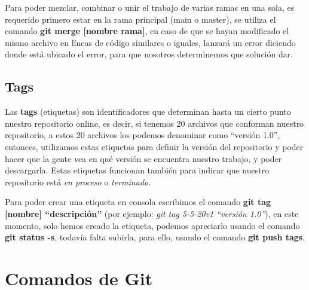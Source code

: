Para poder mezclar, combinar o unir el trabajo de varias ramas en una sola, es requerido primero estar en la rama principal (main o master), se utiliza el comando \textbf{git merge [nombre rama]}, en caso de que se hayan modificado el mismo archivo en líneas de código similares o iguales, lanzará un error diciendo donde está ubicado el error, para que nosotros determinemos que solución dar.


\subsection{Tags}

Las \textbf{tags} (etiquetas) son identificadores que determinan hasta un cierto punto nuestro repositorio online, es decir, si tenemos 20 archivos que conforman nuestro repositorio, a estos 20 archivos los podemos denominar como “versión 1.0”, entonces, utilizamos estas etiquetas para definir la versión del repositorio y poder hacer que la gente vea en qué versión se encuentra nuestro trabajo, y poder descargarla. Estas etiquetas funcionan también para indicar que nuestro repositorio está \textit{en proceso} o \textit{terminado}.

Para poder crear una etiqueta en consola escribimos el comando \textbf{git tag [nombre] “descripción”} (por ejemplo: \textit{git tag 5-5-20v1 “versión 1.0”}), en este momento, solo hemos creado la etiqueta, podemos apreciarlo usando el comando \textbf{git status -s}, todavía falta subirla, para ello, usando el comando \textbf{git push tags}.



\section{Comandos de Git}

